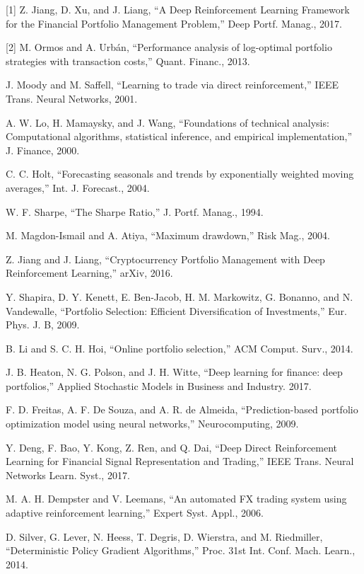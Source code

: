 \documentclass[journal,onecolumn]{IEEEtran}
\begin{document}

\begin{thebibliography}{1}
	[1] Z. Jiang, D. Xu, and J. Liang, “A Deep Reinforcement Learning Framework for the Financial Portfolio Management Problem,” Deep Portf. Manag., 2017.
	
	[2] M. Ormos and A. Urbán, “Performance analysis of log-optimal portfolio strategies with transaction costs,” Quant. Financ., 2013.
	
	J. Moody and M. Saffell, “Learning to trade via direct reinforcement,” IEEE Trans. Neural Networks, 2001.
	
	A. W. Lo, H. Mamaysky, and J. Wang, “Foundations of technical analysis: Computational algorithms, statistical inference, and empirical implementation,” J. Finance, 2000.
	
	C. C. Holt, “Forecasting seasonals and trends by exponentially weighted moving averages,” Int. J. Forecast., 2004.
	
	W. F. Sharpe, “The Sharpe Ratio,” J. Portf. Manag., 1994.
	
	M. Magdon-Ismail and A. Atiya, “Maximum drawdown,” Risk Mag., 2004.
	
	Z. Jiang and J. Liang, “Cryptocurrency Portfolio Management with Deep Reinforcement Learning,” arXiv, 2016.
	
	Y. Shapira, D. Y. Kenett, E. Ben-Jacob, H. M. Markowitz, G. Bonanno, and N. Vandewalle, “Portfolio Selection: Efficient Diversification of Investments,” Eur. Phys. J. B, 2009.
	
	B. Li and S. C. H. Hoi, “Online portfolio selection,” ACM Comput. Surv., 2014.
	
	J. B. Heaton, N. G. Polson, and J. H. Witte, “Deep learning for finance: deep portfolios,” Applied Stochastic Models in Business and Industry. 2017.
	
	F. D. Freitas, A. F. De Souza, and A. R. de Almeida, “Prediction-based portfolio optimization model using neural networks,” Neurocomputing, 2009.
	
	Y. Deng, F. Bao, Y. Kong, Z. Ren, and Q. Dai, “Deep Direct Reinforcement Learning for Financial Signal Representation and Trading,” IEEE Trans. Neural Networks Learn. Syst., 2017.
	
	M. A. H. Dempster and V. Leemans, “An automated FX trading system using adaptive reinforcement learning,” Expert Syst. Appl., 2006.
	
	D. Silver, G. Lever, N. Heess, T. Degris, D. Wierstra, and M. Riedmiller, “Deterministic Policy Gradient Algorithms,” Proc. 31st Int. Conf. Mach. Learn., 2014.
\end{thebibliography}
\end{document}
